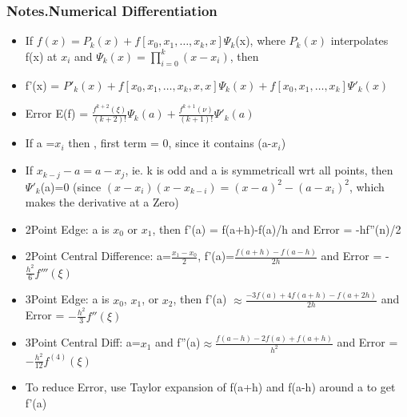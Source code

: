 \documentclass[12pt,letterpaper]{article}
\newcommand\asgnname{Notes}         %
\newenvironment{answer}[1]{
  \subsubsection*{%
  \asgnname.#1}
}{\newpage}
\begin{document}
\begin{answer}{Numerical Differentiation}
\begin{itemize}
    \item If $f(x) = P_k(x) + f[ x_0, x_1, \ldots, x_k, x ]\Psi_k$(x), where $P_k(x)$ interpolates f(x) at $x_i$ and $\Psi_k(x) = \prod_{i=0}^k(x-x_i)$, then
    \item f'(x) = $P'_k(x) + f[ x_0, x_1, \ldots, x_k, x, x]\Psi_k(x) + f[ x_0, x_1, \ldots, x_k ]\Psi '_k(x)$
    \item Error E(f) = $\frac{f^{k+2}(\xi)}{(k+2)!}\Psi_k(a) + \frac{f^{k+1}(\nu)}{(k+1)!}\Psi '_k(a)$ 
    \item If a =$x_i$ then , first term = 0, since it contains (a-$x_i$)
    \item If $x_{k-j} - a = a - x_j$, ie. k is odd and a is symmetricall wrt all points, then $\Psi '_k$(a)=0 (since $(x-x_i)(x-x_{k-i})=(x-a)^2-(a-x_i)^2$, which makes the derivative at a Zero)
    \item 2Point Edge: a is $x_0$ or $x_1$, then f'(a) = f(a+h)-f(a)/h and Error = -hf''(n)/2
    \item 2Point Central Difference: a=$\frac{x_1-x_0}{2}$, f'(a)=$\frac{f(a+h)-f(a-h)}{2h}$ and Error = -$\frac{h^2}{6}f'''(\xi)$
    \item 3Point Edge: a is $x_0$, $x_1$, or $x_2$, then f'(a) $\approx \frac{-3f(a)+4f(a+h)-f(a+2h)}{2h}$ and Error = $-\frac{h^2}{3}f''(\xi)$
    \item 3Point Central Diff: a=$x_1$ and f''(a)$\approx \frac{f(a-h)-2f(a)+f(a+h)}{h^2}$ and Error = $-\frac{h^2}{12}f^{(4)}(\xi)$
    \item To reduce Error, use Taylor expansion of f(a+h) and f(a-h) around a to get f'(a)
\end{itemize}
\end{answer}
\end{document}
